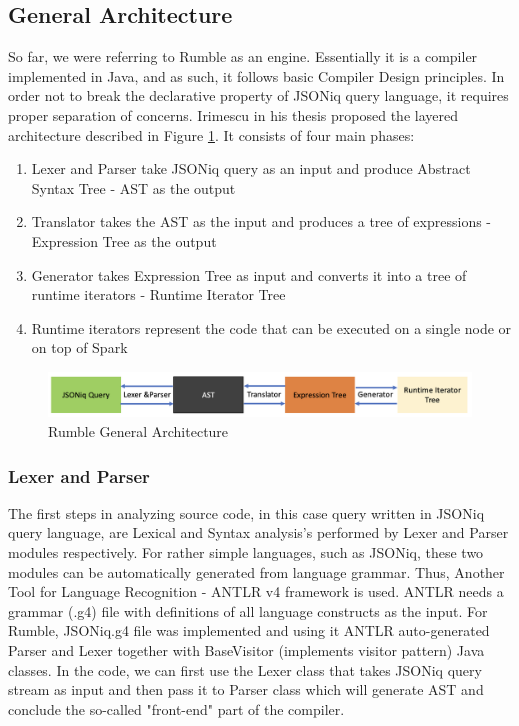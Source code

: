 \subsection{General Architecture}
\label{sec:RumbleArchitecture}
So far, we were referring to Rumble as an engine. Essentially it is a compiler implemented in Java, and as such, it follows basic Compiler Design principles. In order not to break the declarative property of JSONiq query language, it requires proper separation of concerns. Irimescu in his thesis \cite{RumbleThesis} proposed the layered architecture described in Figure \ref{fig:Rumble_General_Architecture}. It consists of four main phases:
\begin{enumerate}
	\item Lexer and Parser take JSONiq query as an input and produce Abstract Syntax Tree - AST as the output 
	\item Translator takes the AST as the input and produces a tree of expressions - Expression Tree as the output
	\item Generator takes Expression Tree as input and converts it into a tree of runtime iterators - Runtime Iterator Tree
	\item Runtime iterators represent the code that can be executed on a single node or on top of Spark
\end{enumerate} 

\begin{figure}[h!]
	\includegraphics[width=\linewidth]{parsing_architecture.png}
	\caption{Rumble General Architecture}
	\label{fig:Rumble_General_Architecture}
\end{figure}

\subsubsection{Lexer and Parser}
\label{sec:RumbleLexerParser}
The first steps in analyzing source code, in this case query written in JSONiq query language, are Lexical and Syntax analysis's performed by Lexer and Parser modules respectively. For rather simple languages, such as JSONiq, these two modules can be automatically generated from language grammar. Thus, Another Tool for Language Recognition - ANTLR v4 framework \cite{ANTLR} is used. ANTLR needs a grammar (.g4) file with definitions of all language constructs as the input. For Rumble, JSONiq.g4 file was implemented and using it ANTLR auto-generated Parser and Lexer together with BaseVisitor (implements visitor pattern) Java classes. In the code, we can first use the Lexer class that takes JSONiq query stream as input and then pass it to Parser class which will generate AST and conclude the so-called "front-end" part of the compiler.

